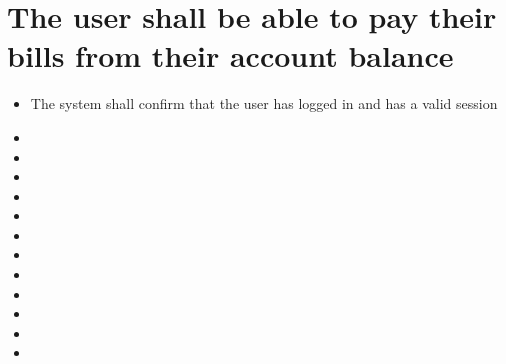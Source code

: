 \section{The user shall be able to pay their bills from their account balance}
\begin{itemize}
    \item The system shall confirm that the user has logged in and has a valid session
    \item 
    
    \item \item \item \item \item \item \item \item \item \item \item 
\end{itemize}